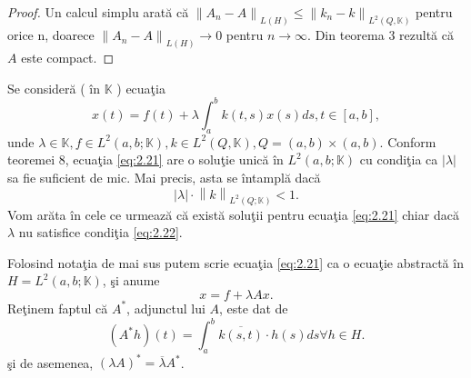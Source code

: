 \documentclass[a4paper,12pt,oneside]{report}
\begin{document}
\begin{proof}
Un calcul simplu arat\u{a} c\u{a} \(\left \| A_{n}-A \right \|_{L\left ( H \right )}\leq \left \| k_{n}  -k\right \|_{L^{2}\left ( Q,\mathbb{K}  \right )}\) pentru orice n, doarece   \(\left \| A_{n}-A \right \|_{L\left ( H \right )}\rightarrow 0\) pentru  \(n \rightarrow \infty\). Din teorema 3 rezult\u{a} c\u{a} \(A\) este compact.
\noindent
\end{proof}

\noindent Se consider\u{a} ( \^{i}n \( \mathbb{K}\) ) ecua\c{t}ia
\begin{displaymath}
x\left ( t \right ) = f\left ( t \right ) + \lambda \int_{a}^{b}k\left ( t,s \right )x\left ( s \right )ds, t\in \left [ a,b \right ], \label{eq:2.21} \tag{2.21}
\end{displaymath}
\noindent unde \(\lambda \in \mathbb{K}, f\in L^{2}\left ( a,b; \mathbb{K} \right ), k\in L^{2} \left ( Q,\mathbb{K} \right ), Q = \left ( a,b \right )\times \left ( a,b \right )\). Conform teoremei 8, ecua\c{t}ia \ref{eq:2.21} are o solu\c{t}ie unic\u{a} \^{i}n \(L^{2}\left ( a,b;\mathbb{K} \right )\) cu condi\c{t}ia ca \(\left | \lambda  \right |\) sa fie suficient de mic. Mai precis, asta se \^{i}ntampl\u{a} dac\u{a}
\begin{displaymath}
\left | \lambda  \right | \cdot \left \| k \right \|_{L^{2}\left ( Q;\mathbb{K} \right )}< 1. \label{eq:2.22} \tag{2.22}
\end{displaymath}
\noindent Vom ar\u{a}ta \^{i}n cele ce urmeaz\u{a} c\u{a} exist\u{a} solu\c{t}ii pentru ecua\c{t}ia \ref{eq:2.21} chiar dac\u{a} \(\lambda\) nu satisfice condi\c{t}ia \ref{eq:2.22}.

Folosind nota\c{t}ia de mai sus putem scrie ecua\c{t}ia \ref{eq:2.21} ca o ecua\c{t}ie abstract\u{a} \^{i}n \(H = L^{2}\left ( a,b; \mathbb{K} \right )\), \c{s}i anume
\begin{displaymath}
x = f + \lambda Ax. \label{eq:2.23} \tag{2.23}
\end{displaymath}
\noindent Re\c{t}inem faptul c\u{a} \(A^{\ast }\), adjunctul lui \(A\), este dat de
\begin{displaymath}
\left (A^{\ast }h  \right )\left ( t \right ) = \int_{a}^{b}\overline{k\left ( s,t \right )}\cdot h\left ( s \right )ds \forall h \in H.
\end{displaymath}
\noindent \c{s}i de asemenea, \(\left ( \lambda A \right )^{\ast } = \overline{\lambda }A^{\ast }\).
\end{document}
